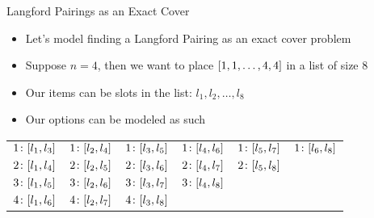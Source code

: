 \documentclass[aspectratio=169, handout]{beamer}
\begin{document}
\begin{frame}{Langford Pairings as an Exact Cover}
    \begin{itemize}
        \item Let's model finding a Langford Pairing as an exact cover problem
        \item Suppose $n = 4$, then we want to place $\bqty{1, 1, \ldots, 4, 4}$ in a list of size 8
        \item Our items can be slots in the list: $l_1, l_2, \ldots, l_8$
        \item Our options can be modeled as such
    \end{itemize}
    \begin{table}[]
        \begin{tabular}{llllll}
            $1\colon \bqty{l_1, l_3}$ & $1\colon \bqty{l_2, l_4}$ & $1\colon \bqty{l_3, l_5}$ & $1\colon \bqty{l_4, l_6}$ & $1\colon \bqty{l_5, l_7}$ & $1\colon \bqty{l_6, l_8}$ \\[10pt]
            $2\colon \bqty{l_1, l_4}$ & $2\colon \bqty{l_2, l_5}$ & $2\colon \bqty{l_3, l_6}$ & $2\colon \bqty{l_4, l_7}$ & $2\colon \bqty{l_5, l_8}$ &                           \\[10pt]
            $3\colon \bqty{l_1, l_5}$ & $3\colon \bqty{l_2, l_6}$ & $3\colon \bqty{l_3, l_7}$ & $3\colon \bqty{l_4, l_8}$ &                           &                           \\[10pt]
            $4\colon \bqty{l_1, l_6}$ & $4\colon \bqty{l_2, l_7}$ & $4\colon \bqty{l_3, l_8}$ &                           &                           &                          
        \end{tabular}
    \end{table}
\end{frame}
\end{document}
